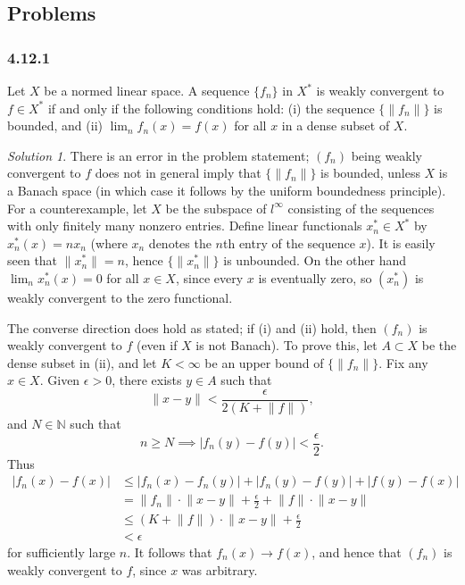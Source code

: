 \documentclass{report}
\newcommand{\bb}[1]{\mathbb{#1}}
\newcommand{\norm}[1]{{\lVert #1 \rVert}}
\theoremstyle{remark}
\newtheorem*{solution}{Solution}
\begin{document}
\subsection*{Problems}

\subsubsection*{4.12.1}
Let $X$ be a normed linear space. A sequence $\{f_n\}$ in $X^*$ is weakly convergent to $f \in X^*$ if and only if the following conditions hold: (i) the sequence $\{\norm{f_n}\}$ is bounded, and (ii) $\lim_n f_n(x) = f(x)$ for all $x$ in a dense subset of $X$.

\begin{solution}
  There is an error in the problem statement; $(f_n)$ being weakly convergent to $f$ does not in general imply that $\{\norm{f_n}\}$ is bounded, unless $X$ is a Banach space (in which case it follows by the uniform boundedness principle). For a counterexample, let $X$ be the subspace of $l^\infty$ consisting of the sequences with only finitely many nonzero entries. Define linear functionals $x^*_n \in X^*$ by $x^*_n(x) = nx_n$ (where $x_n$ denotes the $n$th entry of the sequence $x$). It is easily seen that $\norm{x_n^*} = n$, hence $\{\norm{x^*_n}\}$ is unbounded. On the other hand $\lim_n x_n^*(x) = 0$ for all $x \in X$, since every $x$ is eventually zero, so $(x_n^*)$ is weakly convergent to the zero functional.

  The converse direction does hold as stated; if (i) and (ii) hold, then $(f_n)$ is weakly convergent to $f$ (even if $X$ is not Banach). To prove this, let $A \subset X$ be the dense subset in (ii), and let $K < \infty$ be an upper bound of $\{\norm{f_n}\}$. Fix any $x \in X$. Given $\epsilon > 0$, there exists $y \in A$ such that
  \begin{equation*}
    \norm{x-y} < \frac{\epsilon}{2(K + \norm f)},
  \end{equation*}
  and $N \in \bb N$ such that
  \begin{equation*}
    n \ge N \implies |f_n(y) - f(y)| < \frac{\epsilon}{2}.
  \end{equation*}
  Thus
  \begin{equation*}
    \begin{split}
      |f_n(x) - f(x)| &\le |f_n(x) - f_n(y)| + |f_n(y) - f(y)| + |f(y) - f(x)| \\
      &= \norm{f_n} \cdot \norm{x - y} + \frac{\epsilon}{2} + \norm f \cdot \norm{x-y} \\
      &\le (K + \norm f) \cdot \norm{x-y} + \frac{\epsilon}{2} \\
      &< \epsilon
    \end{split}
  \end{equation*}
  for sufficiently large $n$. It follows that $f_n(x) \to f(x)$, and hence that $(f_n)$ is weakly convergent to $f$, since $x$ was arbitrary.
\end{solution}
\end{document}
